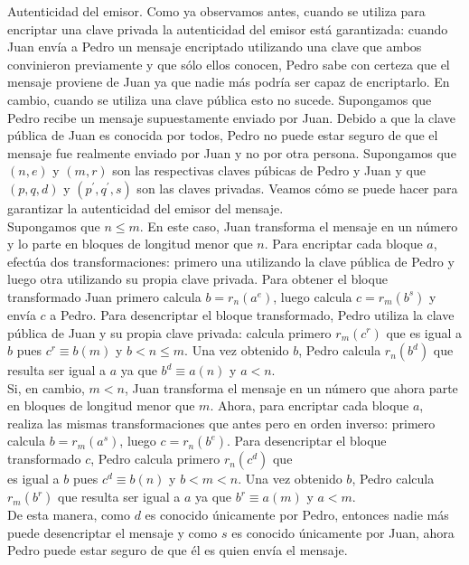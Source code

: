 \documentclass[10pt]{article}
\begin{document}
Autenticidad del emisor. Como ya observamos antes, cuando se utiliza para encriptar una clave privada la autenticidad del emisor está garantizada: cuando Juan envía a Pedro un mensaje encriptado utilizando una clave que ambos convinieron previamente y que sólo ellos conocen, Pedro sabe con certeza que el mensaje proviene de Juan ya que nadie más podría ser capaz de encriptarlo. En cambio, cuando se utiliza una clave pública esto no sucede. Supongamos que Pedro recibe un mensaje supuestamente enviado por Juan. Debido a que la clave pública de Juan es conocida por todos, Pedro no puede estar seguro de que el mensaje fue realmente enviado por Juan y no por otra persona. Supongamos que $(n, e)$ y $(m, r)$ son las respectivas claves púbicas de Pedro y Juan y que $(p, q, d)$ y $\left(p^{\prime}, q^{\prime}, s\right)$ son las claves privadas. Veamos cómo se puede hacer para garantizar la autenticidad del emisor del mensaje.\\
Supongamos que $n \leq m$. En este caso, Juan transforma el mensaje en un número y lo parte en bloques de longitud menor que $n$. Para encriptar cada bloque $a$, efectúa dos transformaciones: primero una utilizando la clave pública de Pedro y luego otra utilizando su propia clave privada. Para obtener el bloque transformado Juan primero calcula $b=r_{n}\left(a^{e}\right)$, luego calcula $c=r_{m}\left(b^{s}\right)$ y envía $c$ a Pedro. Para desencriptar el bloque transformado, Pedro utiliza la clave pública de Juan y su propia clave privada: calcula primero $r_{m}\left(c^{r}\right)$ que es igual a $b$ pues $c^{r} \equiv b(m)$ y $b<n \leq m$. Una vez obtenido $b$, Pedro calcula $r_{n}\left(b^{d}\right)$ que resulta ser igual a $a$ ya que $b^{d} \equiv a(n)$ y $a<n$.\\
Si, en cambio, $m<n$, Juan transforma el mensaje en un número que ahora parte en bloques de longitud menor que $m$. Ahora, para encriptar cada bloque $a$, realiza las mismas transformaciones que antes pero en orden inverso: primero calcula $b=r_{m}\left(a^{s}\right)$, luego $c=r_{n}\left(b^{e}\right)$. Para desencriptar el bloque transformado $c$, Pedro calcula primero $r_{n}\left(c^{d}\right)$ que\\
es igual a $b$ pues $c^{d} \equiv b(n)$ y $b<m<n$. Una vez obtenido $b$, Pedro calcula $r_{m}\left(b^{r}\right)$ que resulta ser igual a $a$ ya que $b^{r} \equiv a(m)$ y $a<m$.\\
De esta manera, como $d$ es conocido únicamente por Pedro, entonces nadie más puede desencriptar el mensaje y como $s$ es conocido únicamente por Juan, ahora Pedro puede estar seguro de que él es quien envía el mensaje.
\end{document}
